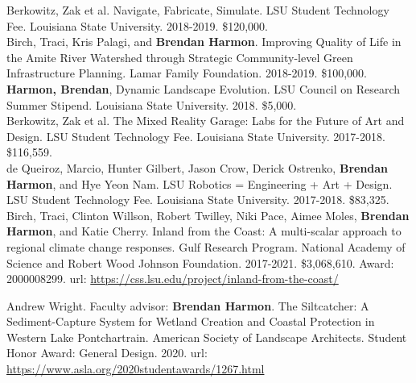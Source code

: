 \documentclass[10pt]{developercv} %
\begin{document}
Berkowitz, Zak et al. Navigate, Fabricate, Simulate. 
LSU Student Technology Fee. 
Louisiana State University. 
2018-2019.	\$120,000.\\

Birch, Traci, Kris Palagi, and \textbf{Brendan Harmon}. 
Improving Quality of Life in the Amite River Watershed through Strategic Community-level Green Infrastructure Planning. 
Lamar Family Foundation. 
2018-2019. \$100,000.\\

\textbf{Harmon, Brendan}, 
Dynamic Landscape Evolution. 
LSU Council on Research Summer Stipend. 
Louisiana State University. 
2018. \$5,000.\\

Berkowitz, Zak et al. 
The Mixed Reality Garage: Labs for the Future of Art and Design. 
LSU Student Technology Fee. 
Louisiana State University. 
2017-2018. \$116,559.\\

de Queiroz, Marcio, Hunter Gilbert, Jason Crow, Derick Ostrenko, \textbf{Brendan Harmon}, and Hye Yeon Nam. 
LSU Robotics = Engineering + Art + Design. 
LSU Student Technology Fee. 
Louisiana State University. 
2017-2018. \$83,325.\\

Birch, Traci, Clinton Willson, Robert Twilley, Niki Pace, Aimee Moles, \textbf{Brendan Harmon}, and Katie Cherry.
Inland from the Coast: A multi-scalar approach to regional climate change responses. 
Gulf Research Program. 
National Academy of Science and Robert Wood Johnson Foundation.
2017-2021. \$3,068,610. Award: 2000008299.
url: \url{https://css.lsu.edu/project/inland-from-the-coast/}\\






Andrew Wright. Faculty advisor: \textbf{Brendan Harmon}. The Siltcatcher: A Sediment-Capture System for Wetland Creation and Coastal Protection in Western Lake Pontchartrain. American Society of Landscape Architects. Student Honor Award: General Design. 2020. url: \url{https://www.asla.org/2020studentawards/1267.html}\\
\end{document}
